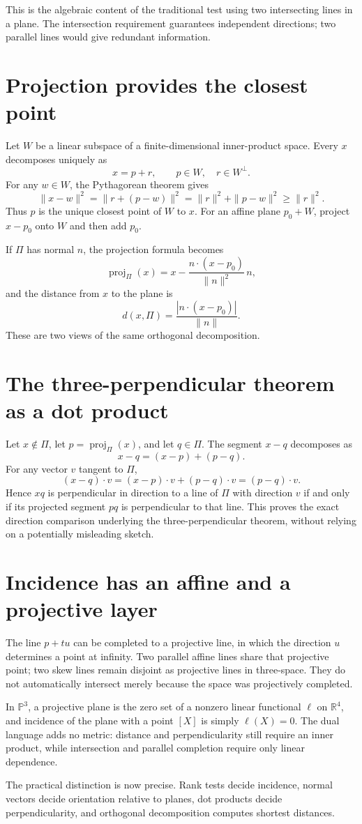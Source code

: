 This is the algebraic content of the traditional test using two intersecting lines in a plane. The intersection requirement guarantees independent directions; two parallel lines would give redundant information.

\section{Projection provides the closest point}

Let \(W\) be a linear subspace of a finite-dimensional inner-product space. Every \(x\) decomposes uniquely as
\[
 x=p+r,\qquad p\in W,\quad r\in W^\perp.
\]
For any \(w\in W\), the Pythagorean theorem gives
\[
 \|x-w\|^2=\|r+(p-w)\|^2
 =\|r\|^2+\|p-w\|^2\ge\|r\|^2.
\]
Thus \(p\) is the unique closest point of \(W\) to \(x\). For an affine plane \(p_0+W\), project \(x-p_0\) onto \(W\) and then add \(p_0\).

If \(\Pi\) has normal \(n\), the projection formula becomes
\[
 \operatorname{proj}_{\Pi}(x)
 =x-\frac{n\cdot(x-p_0)}{\|n\|^2}\,n,
\]
and the distance from \(x\) to the plane is
\[
 d(x,\Pi)=\frac{|n\cdot(x-p_0)|}{\|n\|}.
\]
These are two views of the same orthogonal decomposition.

\section{The three-perpendicular theorem as a dot product}

Let \(x\notin\Pi\), let \(p=\operatorname{proj}_\Pi(x)\), and let \(q\in\Pi\). The segment \(x-q\) decomposes as
\[
 x-q=(x-p)+(p-q).
\]
For any vector \(v\) tangent to \(\Pi\),
\[
 (x-q)\cdot v=(x-p)\cdot v+(p-q)\cdot v=(p-q)\cdot v.
\]
Hence \(xq\) is perpendicular in direction to a line of \(\Pi\) with direction \(v\) if and only if its projected segment \(pq\) is perpendicular to that line. This proves the exact direction comparison underlying the three-perpendicular theorem, without relying on a potentially misleading sketch.

\section{Incidence has an affine and a projective layer}

The line \(p+tu\) can be completed to a projective line, in which the direction \(u\) determines a point at infinity. Two parallel affine lines share that projective point; two skew lines remain disjoint as projective lines in three-space. They do not automatically intersect merely because the space was projectively completed.

In \(\mathbb P^3\), a projective plane is the zero set of a nonzero linear functional \(\ell\) on \(\mathbb R^4\), and incidence of the plane with a point \([X]\) is simply \(\ell(X)=0\). The dual language adds no metric: distance and perpendicularity still require an inner product, while intersection and parallel completion require only linear dependence.

The practical distinction is now precise. Rank tests decide incidence, normal vectors decide orientation relative to planes, dot products decide perpendicularity, and orthogonal decomposition computes shortest distances.
